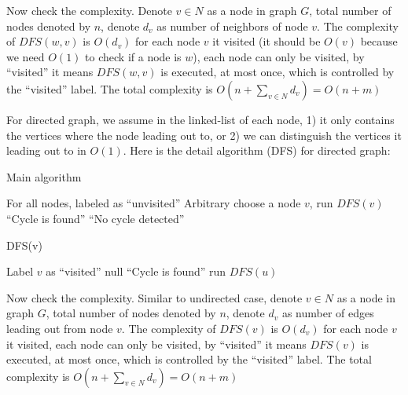 					Now check the complexity. Denote $v\in N$ as a node in graph $G$, total number of nodes denoted by $n$, denote $d_v$ as number of neighbors of node $v$. The complexity of $DFS(w, v)$ is $O(d_v)$ for each node $v$ it visited (it should be $O(v)$ because we need $O(1)$ to check if a node is $w$), each node can only be visited, by ``visited'' it means $DFS(w, v)$ is executed, at most once, which is controlled by the ``visited'' label. The total complexity is $O(n + \sum_{v\in N} d_v) = O(n + m)$

					For directed graph, we assume in the linked-list of each node, 1) it only contains the vertices where the node leading out to, or 2) we can distinguish the vertices it leading out to in $O(1)$. Here is the detail algorithm (DFS) for directed graph:
					\begin{algorithm}[H]
						\caption{Main algorithm}
						\begin{algorithmic}[1]
							\State For all nodes, labeled as ``unvisited''
							\State Arbitrary choose a node $v$, run $DFS(v)$
								\State \Return ``Cycle is found''
							\Else
								\State \Return ``No cycle detected''
							\EndIf
						\end{algorithmic}
					\end{algorithm}

					\begin{algorithm}[H]
						\caption{DFS(v)}
						\begin{algorithmic}[1]
							\State Label $v$ as ``visited''
								\State \Return null
							\Else
										\State \Return ``Cycle is found'' 
									\Else
										\State run $DFS(u)$
									\EndIf
								\EndFor
							\EndIf
						\end{algorithmic}
					\end{algorithm}

					Now check the complexity. Similar to undirected case, denote $v\in N$ as a node in graph $G$, total number of nodes denoted by $n$, denote $d_v$ as number of edges leading out from node $v$. The complexity of $DFS(v)$ is $O(d_v)$ for each node $v$ it visited, each node can only be visited, by ``visited'' it means $DFS(v)$ is executed, at most once, which is controlled by the ``visited'' label. The total complexity is $O(n + \sum_{v\in N} d_v) = O(n + m)$

